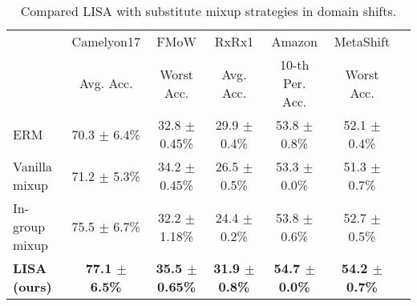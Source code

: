 \begin{table*}[h]
\small
\caption{Compared LISA with substitute mixup strategies in domain shifts.}
\vspace{0.5em}
\label{tab:domain_ablation}
\begin{center}
\begin{tabular}{l|cccccc}
\toprule
\multirow{2}{*}{}  & Camelyon17 & FMoW & RxRx1 & Amazon &  MetaShift\\\cmidrule{2-6}
& Avg. Acc. & Worst Acc. & Avg. Acc. & 10-th Per. Acc. & Worst Acc.\\\midrule
ERM & 70.3 $\pm$ 6.4\% & 32.8 $\pm$ 0.45\%  & 29.9 $\pm$ 0.4\% & 53.8 $\pm$ 0.8\% & 52.1 $\pm$ 0.4\% \\
Vanilla mixup & 71.2 $\pm$ 5.3\% & 34.2 $\pm$ 0.45\% & 26.5 $\pm$ 0.5\% & 53.3 $\pm$ 0.0\% & 51.3 $\pm$ 0.7\% \\
In-group mixup & 75.5 $\pm$ 6.7\% & 32.2 $\pm$ 1.18\% & 24.4 $\pm$ 0.2\% & 53.8 $\pm$ 0.6\% & 52.7 $\pm$ 0.5\%\\\midrule
\textbf{LISA (ours)} & \textbf{77.1 $\pm$ 6.5\%} & \textbf{35.5 $\pm$ 0.65\%} & \textbf{31.9 $\pm$ 0.8\%} & \textbf{54.7 $\pm$ 0.0\%} & \textbf{54.2 $\pm$ 0.7\%} \\
\bottomrule
\end{tabular}
\end{center}
\vspace{-1em}
\end{table*}

